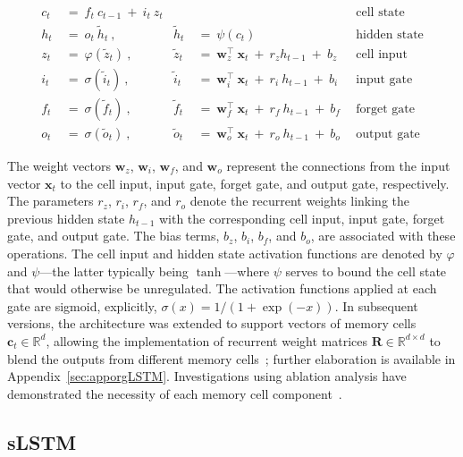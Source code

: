\begin{align}
c_t \ &= \  f_t \ c_{t-1} \ + \ i_t \ z_t &  & &\text{cell state} \\
h_t  \ &= \ o_t \ \tilde{h}_t \ , & \tilde{h}_t \ &= \ \psi \left( c_t\right)
  &\text{hidden state} \\
z_t \ &= \ \varphi \left( \tilde{z}_t \right) \ , 
  &\tilde{z}_t \ &=  \ \mathbf{w}^\top_{z} \ \mathbf{x}_t \ + \
  r_{z}  h_{t-1} \ + \  b_{z} \ \
  &\text{cell input} \\
i_t \ &= \ \sigma \left( \tilde{i}_t  \right) \ , 
  &\tilde{i}_t \ &= \ \mathbf{w}^\top_{i} \ \mathbf{x}_t \ + \
  r_{i}  \ h_{t-1} \ + \  b_{i} \ \
  &\text{input gate} \\
f_t \ &= \ \sigma \left(  \tilde{f}_t \right) \ , 
  &\tilde{f}_t \ &= \ \mathbf{w}^\top_{f} \ \mathbf{x}_t  \ + \
  r_{f}  \ h_{t-1} \ + \  b_{f} \ \
  &\text{forget gate} \\
o_t \ &= \ \sigma \left( \tilde{o}_t \right) \ , 
  &\tilde{o}_t  \ &= \ \mathbf{w}^\top_{o} \ \mathbf{x}_t \ + \
  r_{o}  \ h_{t-1} \ + \  b_{o} \ \
  &\text{output gate} 
\end{align}

The weight vectors $\mathbf{w}_{z}$, $\mathbf{w}_{i}$, $\mathbf{w}_{f}$, and $\mathbf{w}_{o}$ represent the connections from the input vector $\mathbf{x}_t$ to the cell input, input gate, forget gate, and output gate, respectively. The parameters $r_{z}$, $r_{i}$, $r_{f}$, and $r_{o}$ denote the recurrent weights linking the previous hidden state $h_{t-1}$ with the corresponding cell input, input gate, forget gate, and output gate. The bias terms, $b_{z}$, $b_{i}$, $b_{f}$, and $b_{o}$, are associated with these operations. The cell input and hidden state activation functions are denoted by $\varphi$ and $\psi$—the latter typically being $\tanh$—where $\psi$ serves to bound the cell state that would otherwise be unregulated. The activation functions applied at each gate are sigmoid, explicitly, $\sigma(x) = 1/(1 + \exp(-x))$. In subsequent versions, the architecture was extended to support vectors of memory cells $\mathbf{c}_t \in \mathbb{R}^d$, allowing the implementation of recurrent weight matrices $\mathbf{R} \in \mathbb{R}^{d \times d}$ to blend the outputs from different memory cells~\citep{Greff:15}; further elaboration is available in Appendix~\ref{sec:apporgLSTM}. Investigations using ablation analysis have demonstrated the necessity of each memory cell component~\citep{Greff:15}.

\subsection{sLSTM}
\label{sec:sLSTM}

